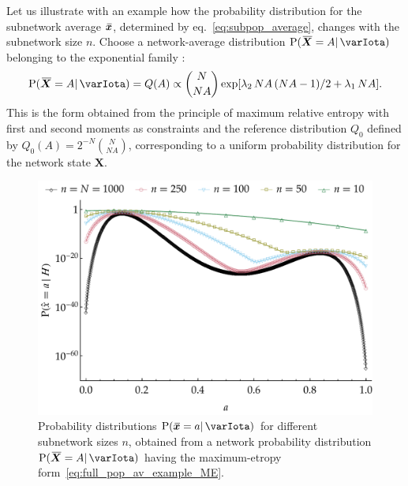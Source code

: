 \documentclass{article}
\theoremstyle{remark}
\theoremstyle{innote}
\newcommand*{\citep}{\parencites}
\renewcommand*{\|}{\mathpunct{|}}%
\newcommand*{\p}{\mathrm{P}}%
\newcommand*{\sect}{\S}%
\newcommand*{\eqn}{eq.}%
\newcommand*{\eg}{{e.g.}}
\theoremstyle{simple}
\newcommand*{\widebar}[1]{{\mkern1.5mu\skew{2}\overline{\mkern-1.5mu#1\mkern-1.5mu}\mkern 1.5mu}}
\newcommand*{\av}{\widebar} %
\newcommand*{\sav}{\widebar} %
\newcommand*{\yxx}{x}%
\newcommand*{\yx}{\bm{\yxx}}%
\newcommand*{\yxs}{\sav{\yx}}%
\newcommand*{\yX}{\bm{X}}%
\newcommand*{\yXf}{\av{\yX}}%
\newcommand*{\yH}{\varIota}
\newcommand*{\yl}{\lambda}
\begin{document}
Let us illustrate with an example how the probability distribution for the
subnetwork average $\yxs$, determined by \eqn~\eqref{eq:subpop_average},
changes with the subnetwork size $n$. Choose a network-average distribution
$\p(\yXf=A\| \yH)$ belonging to the exponential family
\cites[\sect~4.5.3]{bernardoetal1994}[see also][]{fortinietal2000}:
\begin{equation}
  \label{eq:full_pop_av_example_ME}
  \p(\yXf = A \| \yH) = Q(A) \propto
\binom{N}{N A}\exp[
\yl_2\, N A\,(N A-1)/2 + \yl_1\, N A].
\end{equation}
This is the form obtained from the principle of maximum relative entropy
\citep[\eg:][]{jaynes1957,jaynes1963,good1963,jaynes1967,aczeletal1975,jaynes1979b,vancampenhoutetal1981,sivia1990,fangetal1997,bretthorst2013}
with first and second moments as constraints and the reference distribution
$Q_0$ defined by $Q_0(A) = 2^{-N}\binom{N}{N A}$, corresponding to a
uniform probability distribution for the network state $\yX$.
\begin{figure}[!b]
\centering
\includegraphics[width=0.95\columnwidth]{scaled_subpop_probs.pdf}%
\caption{Probability distributions $\p(\yxs = a \| \yH)$ for different
  subnetwork sizes $n$, obtained from a network probability
  distribution $\p(\yXf = A \| \yH)$ having the maximum-etropy
  form~\eqref{eq:full_pop_av_example_ME}.}
\label{scaling_distr}
\end{figure}
\end{document}
